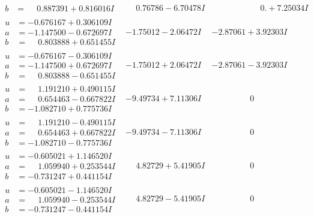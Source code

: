 \documentclass[1p]{elsarticle_modified}
\theoremstyle{definition}
\begin{document}
$$\begin{array}{c|c|c}
\begin{aligned}
b &= \phantom{-}0.887391 + 0.816016 I\end{aligned}
 & \phantom{-}0.76786 - 6.70478 I & \phantom{-0.000000 -}0. + 7.25034 I \\ \hline\begin{aligned}
u &= -0.676167 + 0.306109 I \\
a &= -1.147500 - 0.672697 I \\
b &= \phantom{-}0.803888 + 0.651455 I\end{aligned}
 & -1.75012 - 2.06472 I & -2.87061 + 3.92303 I \\ \hline\begin{aligned}
u &= -0.676167 - 0.306109 I \\
a &= -1.147500 + 0.672697 I \\
b &= \phantom{-}0.803888 - 0.651455 I\end{aligned}
 & -1.75012 + 2.06472 I & -2.87061 - 3.92303 I \\ \hline\begin{aligned}
u &= \phantom{-}1.191210 + 0.490115 I \\
a &= \phantom{-}0.654463 - 0.667822 I \\
b &= -1.082710 + 0.775736 I\end{aligned}
 & -9.49734 + 7.11306 I & \phantom{-0.000000 } 0 \\ \hline\begin{aligned}
u &= \phantom{-}1.191210 - 0.490115 I \\
a &= \phantom{-}0.654463 + 0.667822 I \\
b &= -1.082710 - 0.775736 I\end{aligned}
 & -9.49734 - 7.11306 I & \phantom{-0.000000 } 0 \\ \hline\begin{aligned}
u &= -0.605021 + 1.146520 I \\
a &= \phantom{-}1.059940 + 0.253544 I \\
b &= -0.731247 + 0.441154 I\end{aligned}
 & \phantom{-}4.82729 + 5.41905 I & \phantom{-0.000000 } 0 \\ \hline\begin{aligned}
u &= -0.605021 - 1.146520 I \\
a &= \phantom{-}1.059940 - 0.253544 I \\
b &= -0.731247 - 0.441154 I\end{aligned}
 & \phantom{-}4.82729 - 5.41905 I & \phantom{-0.000000 } 0 \\ \hline\begin{aligned}

\end{aligned}
\end{array}$$
\end{document}
